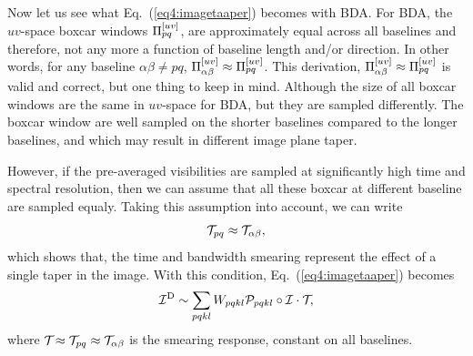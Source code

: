 \documentclass[useAMS,usenatbib]{mn2e}
\begin{document}
Now let us see what Eq.~(\ref{eq4:imagetaaper}) becomes with BDA. For BDA, the $uv$-space boxcar windows $\Pi^{[uv]}_{pq}$,
are approximately equal across all baselines and therefore, not any more a function of baseline length and/or direction. In 
other words,  
for any baseline $\alpha\beta\neq pq$, $\Pi^{[uv]}_{\alpha\beta} \approx \Pi^{[uv]}_{pq}$. This derivation, 
 $\Pi^{[uv]}_{\alpha\beta} \approx \Pi^{[uv]}_{pq}$ is valid and correct, but one thing to keep in mind. Although the size of all boxcar windows are the same in $uv$-space for BDA, but they are sampled differently.
The  boxcar window are well sampled
on the shorter baselines compared to the longer baselines, and which may result in
different image plane taper. 

However, 
if the pre-averaged visibilities are sampled at  significantly  high time and
spectral resolution, then we can assume that all these boxcar at different baseline are sampled equaly.
Taking this assumption into account,  we can write
\begin{equation}
\mathcal{T}_{pq}\approx \mathcal{T}_{\alpha\beta },
\end{equation}
 which shows that, the time and bandwidth smearing represent the effect of a single taper in the image.
 With this condition, Eq.~(\ref{eq4:imagetaaper}) becomes
\begin{equation}
\mathcal{I}^\mathrm{D} \sim  \sum_{pqkl} W_{pqkl} \mathcal{P}_{pqkl} \circ \mathcal{I}\cdot\mathcal{T}_{}, \label{eq:bda2}
\end{equation}
where $\mathcal{T}_{}\approx \mathcal{T}_{pq}\approx \mathcal{T}_{\alpha\beta }$ is the smearing response, constant on all baselines.
\end{document}
